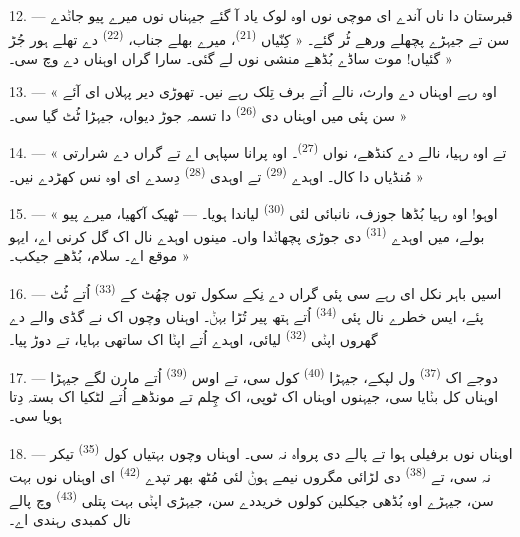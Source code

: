 12. --- قبرستان دا ناں آندے ای موچی نوں اوہ لوک یاد آ گئے جیہناں نوں میرے پیو
جاݨدے سن تے جیہڑے پچھلے ورھے ٹُر گئے۔ « کِنّیاں 
\textsuperscript{(21)}، میرے بھلے جناب،  \textsuperscript{(22)} دے تھلے
ہور جُڑ گئیاں! موت ساڈے بُڈھے منشی نوں لے گئی۔ سارا گراں اوہناں دے
 وچ سی۔ »

13. --- « اوہ رہے اوہناں دے وارث، نالے اُتے برف تِلک رہے نیں۔ تھوڑی دیر پہلاں ای
آئے سن پئی میں اوہناں دی  \textsuperscript{(26)} دا تسمہ جوڑ
دیواں، جیہڑا ٹُٹ گیا سی۔ »

14. --- « تے اوہ رہیا، نالے دے کنڈھے، نواں 
\textsuperscript{(27)}۔ اوہ پرانا سپاہی اے تے گراں دے شرارتی مُنڈیاں دا کال۔ اوہدے
 \textsuperscript{(29)} تے اوہدی 
\textsuperscript{(28)} دِسدے ای اوہ نس کھڑدے نیں۔ »

15. --- « اوہو! اوہ رہیا بُڈھا جوزف، نانبائی لئی  \textsuperscript{(30)} لیاندا ہویا۔ --- ٹھیک آکھیا، میرے پیو بولے، میں اوہدے
 \textsuperscript{(31)} دی جوڑی پچھاݨدا واں۔ مینوں اوہدے نال اک گل
کرنی اے، ایہو موقع اے۔ سلام، بُڈھے جیکب۔ »

16. --- اسیں باہر نکل ای رہے سی پئی گراں دے نِکے سکول توں چھُٹ کے
 \textsuperscript{(33)} اُتے ٹُٹ پئے، ایس خطرے نال پئی
 \textsuperscript{(34)} اُتے ہتھ پیر تُڑا بہݨ۔ اوہناں وچوں اک نے گڈی
والے دے گھروں اپݨی  \textsuperscript{(32)} لیائی، اوہدے اُتے اپݨا اک
ساتھی بہایا، تے دوڑ پیا۔

17. --- دوجے اک  \textsuperscript{(37)} ول لپکے، جیہڑا
 \textsuperscript{(40)} کول سی، تے اوس 
\textsuperscript{(39)} اُتے مارن لگے جیہڑا اوہناں کل بݨایا سی، جیہنوں اوہناں اک
ٹوپی، اک چِلم تے مونڈھے اُتے لٹکیا اک بستہ دِتا ہویا سی۔

18. --- اوہناں نوں برفیلی ہوا تے پالے دی پرواہ نہ سی۔ اوہناں وچوں بہتیاں کول
 \textsuperscript{(35)} تیکر نہ سی، تے 
\textsuperscript{(38)} دی لڑائی مگروں نیمے ہوݨ لئی مُٹھ بھر تپدے
 \textsuperscript{(42)} ای اوہناں نوں بہت سن، جیہڑے اوہ بُڈھی جیکلین
 کولوں خریددے سن، جیہڑی اپݨی بہت پتلی 
\textsuperscript{(43)} وچ پالے نال کمبدی رہندی اے۔

\VUsaut{3.0mm}
\VUsaut{3.0mm}

